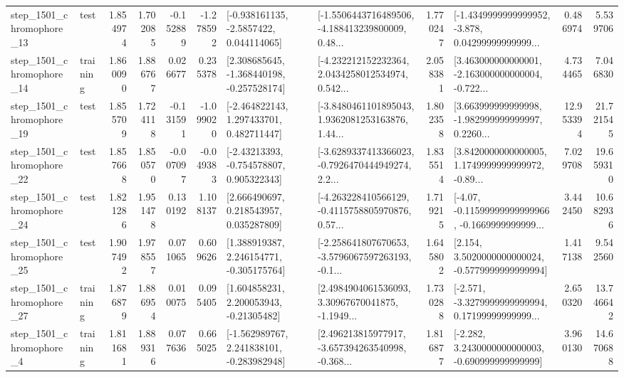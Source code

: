 \begin{tabular}{llrrrrllrlrr}
 step\_1501\_chromophore\_13 &      test &      1.854974 &    1.702085 &     -0.152889 & -1.278592 &     [-0.938161135, -2.5857422, 0.044114065] &  [-1.5506443716489506, -4.188413239800009, 0.48... &       1.770247 &  [-1.4349999999999952, -3.878, 0.04299999999999... &            0.486974 &          5.539706 \\
 step\_1501\_chromophore\_14 &  training &      1.860090 &    1.886767 &      0.026677 &  0.235378 &   [2.308685645, -1.368440198, -0.257528174] &  [-4.232212152232364, 2.0434258012534974, 0.542... &       2.058381 &  [3.463000000000001, -2.163000000000004, -0.722... &            4.734465 &          7.046830 \\
 step\_1501\_chromophore\_19 &      test &      1.855709 &    1.724118 &     -0.131591 & -1.099020 &    [-2.464822143, 1.297433701, 0.482711447] &  [-3.8480461101895043, 1.9362081253163876, 1.44... &       1.802358 &  [3.663999999999998, -1.982999999999997, 0.2260... &           12.953394 &         21.721545 \\
 step\_1501\_chromophore\_22 &      test &      1.857668 &    1.850570 &     -0.007097 & -0.049383 &    [-2.43213393, -0.754578807, 0.905322343] &  [-3.6289337413366023, -0.7926470444949274, 2.2... &       1.835514 &  [3.8420000000000005, 1.1749999999999972, -0.89... &            7.029708 &         19.659310 \\
 step\_1501\_chromophore\_24 &      test &      1.821286 &    1.951478 &      0.130192 &  1.108137 &     [2.666490697, 0.218543957, 0.035287809] &  [-4.263228410566129, -0.4115758805970876, 0.57... &       1.719215 &  [-4.07, -0.11599999999999966, -0.1669999999999... &            3.442450 &         10.682936 \\
 step\_1501\_chromophore\_25 &      test &      1.907492 &    1.978557 &      0.071065 &  0.609626 &    [1.388919387, 2.246154771, -0.305175764] &  [-2.258641807670653, -3.5796067597263193, -0.1... &       1.645802 &   [2.154, 3.5020000000000024, -0.5779999999999994] &            1.417138 &          9.542560 \\
 step\_1501\_chromophore\_27 &  training &      1.876879 &    1.886954 &      0.010075 &  0.095405 &     [1.604858231, 2.200053943, -0.21305482] &  [2.4984904061536093, 3.30967670041875, -1.1949... &       1.730288 &  [-2.571, -3.3279999999999994, 0.17199999999999... &            2.650320 &         13.746642 \\
  step\_1501\_chromophore\_4 &  training &      1.811681 &    1.889316 &      0.077636 &  0.665025 &   [-1.562989767, 2.241838101, -0.283982948] &  [2.496213815977917, -3.657394263540998, -0.368... &       1.816877 &   [-2.282, 3.2430000000000003, -0.690999999999999] &            3.960130 &         14.670688 \\

\end{tabular}
